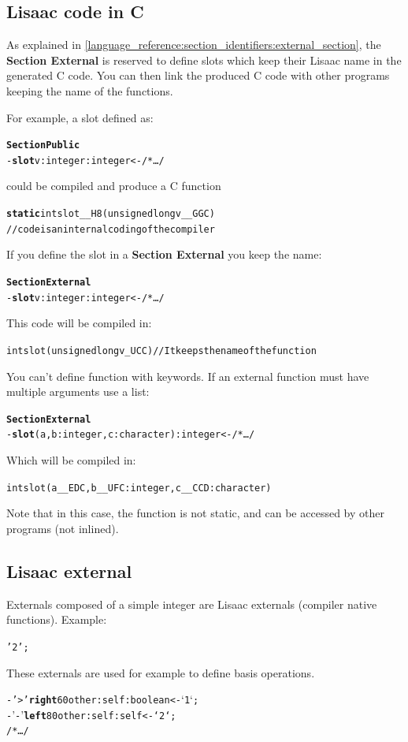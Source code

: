 \documentclass[11pt]{mybook}
\begin{document}
\subsection{Lisaac code in C}
\label{language_reference:externals:external_section}
%
As explained in {\ref{language_reference:section_identifiers:external_section}}, the {\bf{}Section External} is reserved to define slots which keep their Lisaac name in the generated C code.
You can then link the produced C code with other programs keeping the name of the functions.

For example, a slot defined as:
\begin{alltt}
{\bf{}Section Public}
  - {\bf{}slot} v:{\sc{}integer} :{\sc{}integer} <- /* \ldots */
\end{alltt}
could be compiled and produce a C function
\begin{alltt}
{\bf{} static} int slot__H8(unsigned long v__GGC)   
// code is an internal coding of the compiler
\end{alltt}
If you define the slot in a {\bf{}Section External} you keep the name:
\begin{alltt}
{\bf{}Section External}
  - {\bf{}slot} v:{\sc{}integer} :{\sc{}integer} <- /* \ldots */
\end{alltt}
This code will be compiled in:
\begin{alltt}
int slot (unsigned long v_UCC)            // It keeps the name of the function
\end{alltt}
You can't define function with keywords. If an external function must have multiple arguments use a list:
\begin{alltt}
{\bf{}Section External}
  - {\bf{}slot} (a,b:{\sc{}integer},c:{\sc{}character}) :{\sc{}integer} <- /* \ldots */
\end{alltt}
Which will be compiled in:
\begin{alltt}
int slot (a__EDC,b__UFC:integer,c__CCD:character)
\end{alltt}
Note that in this case, the function is not static, and can be accessed by other programs (not inlined).

\subsection{Lisaac external}
\label{language_reference:externals:lisaac_external}
%
Externals composed of a simple integer are Lisaac externals (compiler native functions).
Example:
\begin{alltt}
  '2';
\end{alltt}
These externals are used for example to define basis operations.
\begin{alltt}
  - '>' {\bf{}right} 60 other:{\sc{}self} :{\sc{}boolean} <- `1`;
  - '-' {\bf{}left} 80  other:{\sc{}self} :{\sc{}self}    <- `2`;
 /* \ldots */
\end{alltt} 
\end{document}
